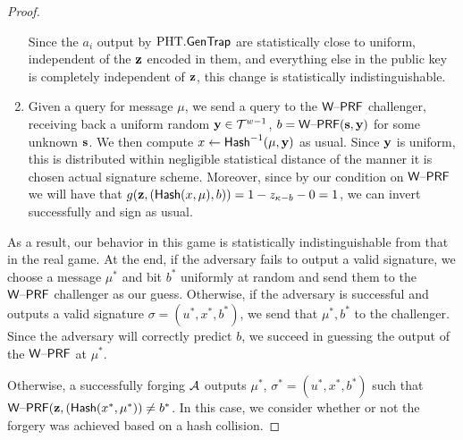 \begin{proof}
\begin{enumerate}
Since the $a_i$ output by $\text{PHT}.\mathsf{GenTrap}$ are statistically close to
uniform, independent of the $\mathbf{z}$ encoded in them, and everything
else in the public key is completely independent of $\mathbf{z}$, this change is
  statistically indistinguishable. 
\item Given a query for message $\mu$, we send a query to the
  $\mathsf{W\text{\textendash}PRF}$ challenger, receiving back a uniform random
  $\mathbf{y} \in \mathcal{T}^{w-1}$, $b=\mathsf{W\text{\textendash}PRF}(\mathbf{s},\mathbf{y})$ for some unknown
  $\mathbf{s}$. We then compute $x \gets \mathsf{Hash}^{-1}(\mu,\mathbf{y})$ as usual.
  Since $\mathbf{y}$ is uniform, this is distributed within negligible
  statistical distance of the manner it is chosen actual signature
  scheme.  Moreover, since by our condition on $\mathsf{W\text{\textendash}PRF}$ we will
  have that $g(\mathbf{z},(\mathsf{Hash}(x,\mu),b))=1-z_{\kappa-b}-0=1$, we can invert
  successfully and sign as usual.
\end{enumerate}
As a result, our behavior in this game is statistically
indistinguishable from that in the real game.   At the end, if the adversary fails
  to output a valid signature, we choose a message $\mu^*$ and bit
  $b^*$ uniformly at random and send them to the $\mathsf{W\text{\textendash}PRF}$ challenger as our
  guess. Otherwise, if the adversary is successful and outputs a valid
  signature $\sigma=(u^*,x^*,b^*)$, we send that $\mu^*, b^*$ to the
  challenger.  Since the adversary will
  correctly predict $b$, we
  succeed in guessing the output of the $\mathsf{W\text{\textendash}PRF}$ at $\mu^*$.

Otherwise, a successfully forging $\mathcal{A}$ outputs $\mu^*$, $\sigma^*=(u^*,x^*,b^*)$ such
that $\mathsf{W\text{\textendash}PRF}(\mathbf{z},(\mathsf{Hash}(x^*,\mu^*)) \neq b^*$. In this case, we
consider whether or not the forgery was achieved based on a hash
collision. 

\end{proof}
